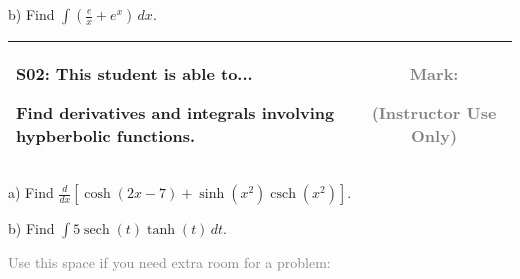 \documentclass[12pt]{article}
\newcommand{\standardQuestion}[2]{
\newpage
\begin{center}
  \begin{tabular}{|l|c|}
  \hline
    \parbox{5in}{
      \textbf{#1}: This student is able to...\\
      #2
    }
  &
    \parbox{1in}{
      \vspace{0.1in}
      \footnotesize \textcolor{gray}{Mark:}
      \vspace{0.7in}

      \tiny \textcolor{gray}{(Instructor Use Only)}
    }
  \\\hline
  \end{tabular}
\end{center}
}
\newcommand{\csch}{\operatorname{csch}}
\newcommand{\sech}{\operatorname{sech}}
\begin{document}
b) Find \(\displaystyle\int\left(\frac{e}{x}+e^x\right)\,dx\).




\standardQuestion{S02}{
  Find derivatives and integrals involving hypberbolic functions.
}

a) Find \(\frac{d}{dx}[\cosh(2x-7)+\sinh(x^2)\csch(x^2)]\).

\vspace{3in}

b) Find \(\displaystyle\int 5\sech(t)\tanh(t)\,dt\).








\newpage

\textcolor{gray}{Use this space if you need extra room for a problem:}
\end{document}
